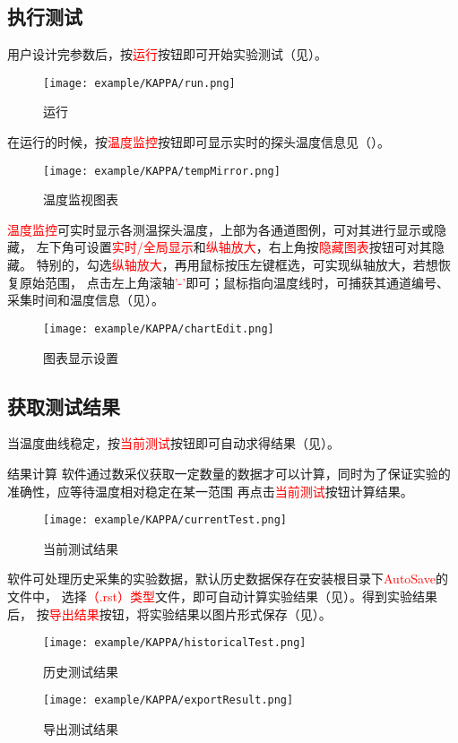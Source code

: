 \subsection{执行测试}
用户设计完参数后，按\textcolor{red}{运行}按钮即可开始实验测试（见）。
\begin{figure}[H]
	\centering
	\texttt{[image: example/KAPPA/run.png]}
	\caption{ 运行 \label{fig:exmp_kappa_run}}
\end{figure}
在运行的时候，按\textcolor{red}{温度监控}按钮即可显示实时的探头温度信息见（）。
\begin{figure}[H]
	\centering
	\texttt{[image: example/KAPPA/tempMirror.png]}
	\caption{ 温度监视图表 \label{fig:exmp_kappa_tempMirror}}
\end{figure}
\textcolor{red}{温度监控}可实时显示各测温探头温度，上部为各通道图例，可对其进行显示或隐藏，
左下角可设置\textcolor{red}{实时/全局显示}和\textcolor{red}{纵轴放大}，右上角按\textcolor{red}{隐藏图表}按钮可对其隐藏。
特别的，勾选\textcolor{red}{纵轴放大}，再用鼠标按压左键框选，可实现纵轴放大，若想恢复原始范围，
点击左上角滚轴\textcolor{red}{'-'}即可；鼠标指向温度线时，可捕获其通道编号、采集时间和温度信息（见）。\\
\begin{figure}[H]
	\centering
	\texttt{[image: example/KAPPA/chartEdit.png]}
	\caption{ 图表显示设置 \label{fig:exmp_kappa_chartEdit}}
\end{figure}

\subsection{获取测试结果}
	当温度曲线稳定，按\textcolor{red}{当前测试}按钮即可自动求得结果（见）。
\begin{tips}{结果计算}
	软件通过数采仪获取一定数量的数据才可以计算，同时为了保证实验的准确性，应等待温度相对稳定在某一范围
再点击\textcolor{red}{当前测试}按钮计算结果。
\end{tips}
\begin{figure}[H]
	\centering
	\texttt{[image: example/KAPPA/currentTest.png]}
	\caption{ 当前测试结果 \label{fig:exmp_kappa_currentTest}}
\end{figure}
软件可处理历史采集的实验数据，默认历史数据保存在安装根目录下\textcolor{red}{AutoSave}的文件中，
选择\textcolor{red}{（.rst）类型}文件，即可自动计算实验结果（见）。得到实验结果后，
按\textcolor{red}{导出结果}按钮，将实验结果以图片形式保存（见）。
\begin{figure}[H]
	\centering
	\texttt{[image: example/KAPPA/historicalTest.png]}
	\caption{ 历史测试结果 \label{fig:exmp_kappa_historicalTest}}
\end{figure}

\begin{figure}[H]
	\centering
	\texttt{[image: example/KAPPA/exportResult.png]}
	\caption{ 导出测试结果 \label{fig:exmp_kappa_exportResult}}
\end{figure}